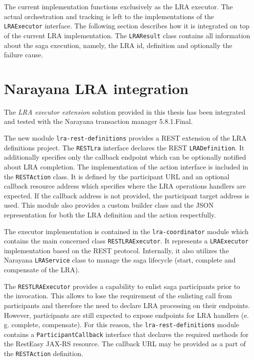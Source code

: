 \documentclass[oneside,
  digital, %
  table,   %
  nolof,     %
  nolot,     %
]{fithesis3}
\begin{document}
The current implementation functions exclusively as the LRA executor. The actual orchestration and tracking is left to the implementations of the \texttt{LRAExecutor} interface. The following section describes how it is integrated on top of the current LRA implementation. The \texttt{LRAResult} class contains all information about the saga execution, namely, the LRA id, definition and optionally the failure cause.

\section{Narayana LRA integration}
\label{sec:narayana-lra-integration}

The \textit{LRA executor extension} solution provided in this thesis has been integrated and tested with the Narayana transaction manager 5.8.1.Final.

The new module \texttt{lra-rest-definitions} provides a REST extension of the LRA definitions project. The \texttt{RESTLra} interface declares the REST \texttt{LRADefinition}. It additionally specifies only the callback endpoint which can be optionally notified about LRA completion. The implementation of the action interface is included in the \texttt{RESTAction} class. It is defined by the participant URL and an optional callback resource address which specifies where the LRA operations handlers are expected. If the callback address is not provided, the participant target address is used. This module also provides a custom builder class and the JSON representation for both the LRA definition and the action respectfully.

The executor implementation is contained in the \texttt{lra-coordinator} module which contains the main concerned class \texttt{RESTLRAExecutor}. It represents a \texttt{LRAExecutor} implementation based on the REST protocol. Internally, it also utilizes the Narayana \texttt{LRAService} class to manage the saga lifecycle (start, complete and compensate of the LRA).

The \texttt{RESTLRAExecutor} provides a capability to enlist saga participants prior to the invocation. This allows to lose the requirement of the enlisting call from participants and therefore the need to declare LRA processing on their endpoints. However, participants are still expected to expose endpoints for LRA handlers (e. g. complete, compensate). For this reason, the \texttt{lra-rest-definitions} module contains a \texttt{ParticipantCallback} interface that declares the required methods for the RestEasy JAX-RS resource. The callback URL may be provided as a part of the \texttt{RESTAction} definition.
\end{document}
